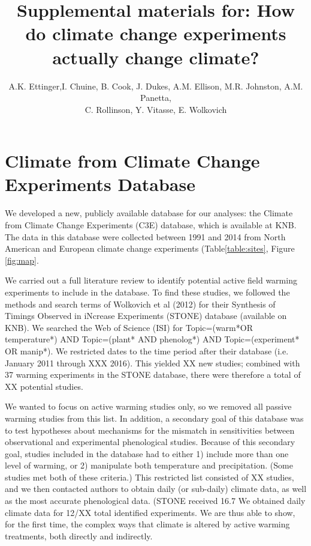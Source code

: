 \documentclass{article}
\begin{document}
 
\title{Supplemental materials for: How do climate change experiments actually change climate?} %

\author{A.K. Ettinger,I. Chuine, B. Cook, J. Dukes, A.M. Ellison, M.R. Johnston, A.M. Panetta,\\ C. Rollinson, Y. Vitasse, E. Wolkovich}
\maketitle  %


\section* {Climate from Climate Change Experiments Database}
We developed a new, publicly available database for our analyses: the Climate from Climate Change Experiments (C3E) database, which is available at KNB. The data in this database were collected between 1991 and 2014 from North American and European climate change experiments (Table\ref{table:sites}, Figure \ref{fig:map}. 
 \par We carried out a full literature review to identify potential active field warming experiments to include in the database. To find these studies, we followed the methods and search terms of Wolkovich et al (2012) for their Synthesis of Timings Observed in iNcrease Experiments (STONE) database (available on KNB). We searched the Web of Science (ISI) for Topic=(warm*OR temperature*) AND Topic=(plant* AND phenolog*) AND Topic=(experiment* OR manip*). We restricted dates to the time period after their database (i.e. January 2011 through XXX 2016). This yielded XX new studies; combined with 37 warming experiments in the STONE database, there were therefore a total of XX potential studies. 
 \par We wanted to focus on active warming studies only, so we removed all passive warming studies from this list. In addition, a secondary goal of this database was to test hypotheses about mechanisms for the mismatch in sensitivities between observational and experimental phenological studies. Because of this secondary goal, studies included in the database had to either 1) include more than one level of warming, or 2) manipulate both temperature and precipitation. (Some studies met both of these criteria.) This restricted list consisted of XX studies, and we then contacted authors to obtain daily (or sub-daily) climate data, as well as the most accurate phenological data. (STONE received 16.7%
We obtained daily climate data for 12/XX total identified experiments. We are thus able to show, for the first time, the complex ways that climate is altered by active warming treatments, both directly and indirectly.
 
\end{document}
